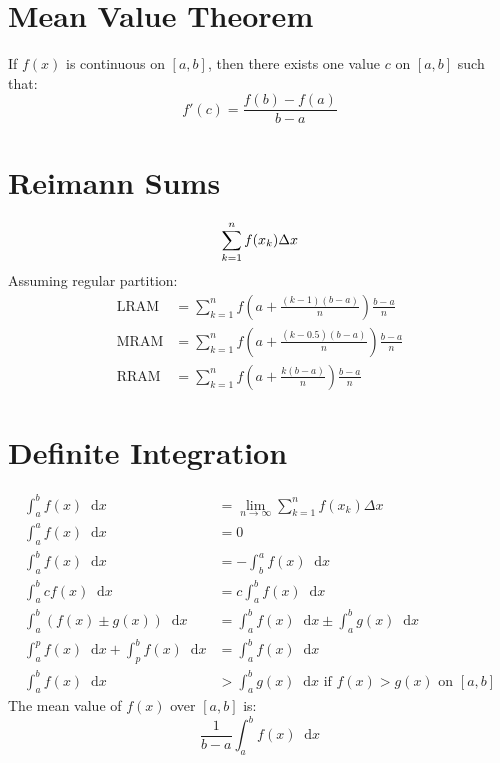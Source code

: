 \documentclass[12pt]{article}
\newcommand*{\fixmath}{\makebox{}\vspace{\glueexpr-\baselineskip-\abovedisplayskip}}
\newcommand*{\D}[1]{\mathop{}\!\mathrm{d} #1}
\newenvironment{rmaskip}{\setlength{\abovedisplayskip}{0pt}\fixmath%
  \ignorespaces}{\ignorespacesafterend}
\newenvironment{rmbskip}{\setlength{\belowdisplayskip}{0pt}\ignorespaces}%
  {\ignorespacesafterend}
\begin{document}
\section*{Mean Value Theorem}
If \(f(x)\) is continuous on \([a,b]\), then there exists one value \(c\) on
\([a,b]\) such that:
\begin{rmbskip}
  \[
    f'(c) = \frac{f(b) - f(a)}{b - a}
  \]
\end{rmbskip}
\section*{Reimann Sums}
\begin{rmaskip}
  \[
    \sum_{k=1}^n f(x_k) \Delta x\\
  \]
\end{rmaskip}
Assuming regular partition:
\begin{rmbskip}
  \begin{align*}
    \text{LRAM} &= \sum_{k=1}^n f\left(a + \frac{(k-1)(b - a)}{n}\right)
      \frac{b-a}{n}\\
    \text{MRAM} &= \sum_{k=1}^n f\left(a + \frac{(k-0.5)(b - a)}{n}\right)
      \frac{b-a}{n}\\
    \text{RRAM} &= \sum_{k=1}^n f\left(a + \frac{k(b - a)}{n}\right)
      \frac{b-a}{n}
  \end{align*}
\end{rmbskip}
\section*{Definite Integration}
\begin{rmaskip}
  \begin{align*}
    \int_a^b f(x) \D{x} &= \lim_{n \to \infty} \sum_{k=1}^n f(x_k)\Delta x\\
    \int_a^a f(x) \D{x} &= 0\\
    \int_a^b f(x) \D{x} &= -\int_b^a f(x) \D{x}\\
    \int_a^b c f(x) \D{x} &= c \int_a^b f(x) \D{x}\\
    \int_a^b (f(x) \pm g(x)) \D{x} &= \int_a^b f(x) \D{x} \pm \int_a^b g(x)
      \D{x}\\
    \int_a^p f(x) \D{x} + \int_p^b f(x) \D{x} &= \int_a^b f(x) \D{x}\\
    \int_a^b f(x) \D{x} &> \int_a^b g(x) \D{x} \text{ if }f(x) > g(x)
      \text{ on } [a,b]
  \end{align*}
\end{rmaskip}
The mean value of \(f(x)\) over \([a,b]\) is:
\begin{rmbskip}
  \[
    \frac{1}{b - a} \int_a^b f(x) \D{x}
  \]
\end{rmbskip}
\end{document}
